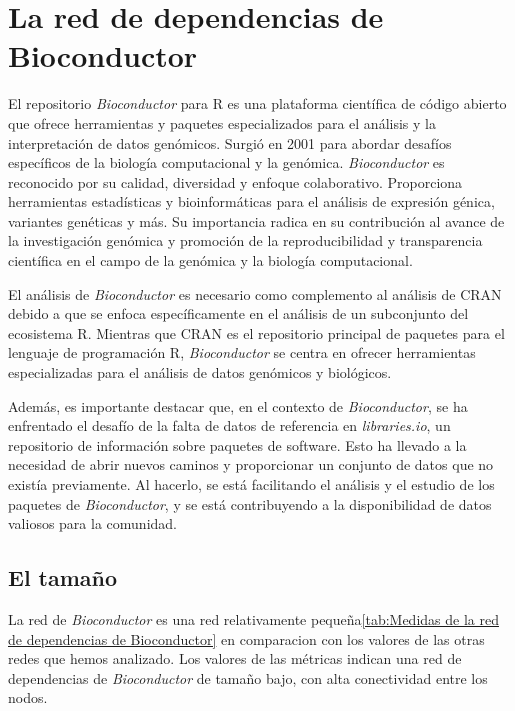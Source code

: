 \section{La red de dependencias de Bioconductor}

El repositorio \textit{Bioconductor} para R es una plataforma científica de código abierto que ofrece
herramientas y paquetes especializados para el análisis y la interpretación de datos genómicos.
Surgió en 2001 para abordar desafíos específicos de la biología computacional y la genómica.
\textit{Bioconductor} es reconocido por su calidad, diversidad y enfoque colaborativo. Proporciona
herramientas estadísticas y bioinformáticas para el análisis de expresión génica, variantes genéticas y más.
Su importancia radica en su contribución al avance de la investigación genómica y promoción de la
reproducibilidad y transparencia científica en el campo de la genómica y la biología computacional.

El análisis de \textit{Bioconductor} es necesario como complemento al análisis de CRAN debido a que se
enfoca específicamente en el análisis de un subconjunto del ecosistema R. Mientras que CRAN es el
repositorio principal de paquetes para el lenguaje de programación R, \textit{Bioconductor} se centra
en ofrecer herramientas especializadas para el análisis de datos genómicos y biológicos.

Además, es importante destacar que, en el contexto de \textit{Bioconductor}, se ha enfrentado el
desafío de la falta de datos de referencia en \textit{libraries.io}, un repositorio de información
sobre paquetes de software. Esto ha llevado a la necesidad de abrir nuevos caminos y proporcionar
un conjunto de datos que no existía previamente. Al hacerlo, se está facilitando el análisis y el
estudio de los paquetes de \textit{Bioconductor}, y se está contribuyendo a la disponibilidad de
datos valiosos para la comunidad.

\subsection{El tamaño}

La red de \textit{Bioconductor} es una red relativamente pequeña\ref{tab:Medidas de la red de dependencias de Bioconductor}
en comparacion con los valores de las otras redes que hemos analizado.
Los valores de las métricas indican una red de dependencias de \textit{Bioconductor} de tamaño bajo,
con alta conectividad entre los nodos.

